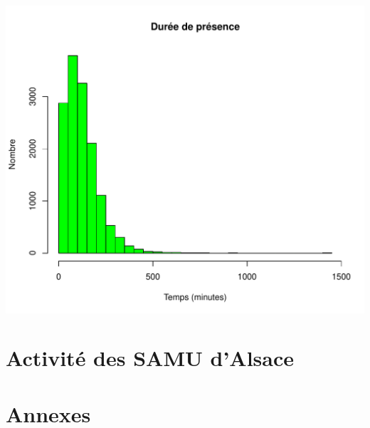 \documentclass[12pt,english,french,twoside]{report}\usepackage[]{graphicx}\usepackage[]{color}
\makeatletter
\def\maxwidth{ %
  \ifdim\Gin@nat@width>\linewidth
    \linewidth
  \else
    \Gin@nat@width
  \fi
}
\newenvironment{knitrout}{}{} %
\makeatother
\begin{document}
\begin{knitrout}
\color{fgcolor}
\includegraphics[width=\maxwidth]{figure/graphe_3fr} 

\end{knitrout}



\part{Activité des SAMU d'Alsace}





\part{Annexes}
\end{document}

